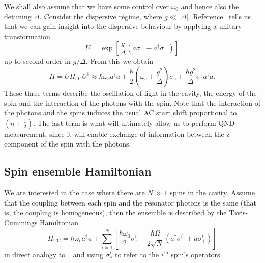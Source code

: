 We shall also assume that we have some control over $\omega_0$ and hence also
the detuning $\Delta$. Consider the dispersive r\'egime, where  $g\ll|\Delta|$.
Reference~\cite{PhysRevA.69.062320} tells us that we can gain insight into the
dispersive behaviour by applying  a unitary transformation
%
\begin{equation} U = \exp \left[\frac{g}{\Delta}(a\sigma_+ -
a^\dagger\sigma_-)\right] \end{equation}
%
up to second order in $g/\Delta$.
From this we obtain
%
\begin{equation} H= UH_\text{JC}U^\dagger \approx \hbar \omega_c
  a^\dagger a + \frac{\hbar}{2}\left(\omega_c +
  \frac{g^2}{\Delta}\right)\sigma_z + \frac{\hbar
  g^2}{\Delta}\sigma_z a^\dagger a.  \end{equation}
%
These three terms describe the oscillation of light in the cavity, the energy
of the spin and the interaction of the photons with the spin. Note that the
interaction of the photons and the spins induces the usual AC start shift
proportional to $(n+\frac{1}{2})$. The last term is what will ultimately allow
us to perform QND measurement, since it will enable exchange of information
between the z-component of the spin with the photons.

\subsection{Spin ensemble Hamiltonian}

We are interested in the case where there are $N\gg1$ spins in the
cavity. Assume that the coupling between each spin and the resonator photons is
the same (that is, the coupling is homogeneous), then the ensemble is described
by the Tavis-Cummings Hamiltonian~\cite{Kirton2019}
%
\begin{equation}
  H_\text{TC}=  \hbar \omega_c a^\dagger a + \sum_{i=1}^N\left[
    \frac{\hbar\omega_0}{2}\sigma_z^i +\frac{\hbar\Omega}{2\sqrt{N}}(a^\dagger
    \sigma^i_- + a\sigma^i_+)\right]
\end{equation}
%
in direct analogy to~, and using $\sigma_*^i$ to refer
to the $i^\text{th}$ spin's operators.

